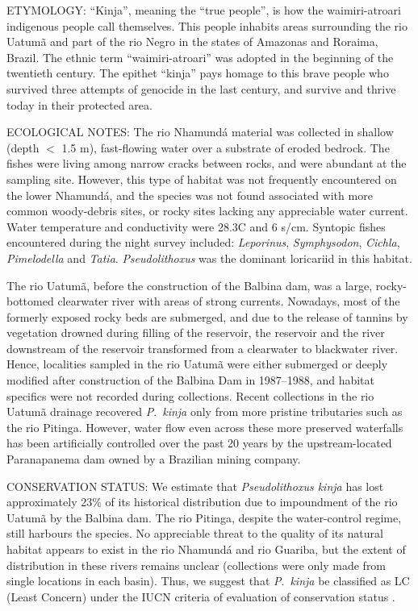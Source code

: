 \documentclass[12pt]{article}
\begin{document}
\noindent ETYMOLOGY: ``Kinja'', meaning the ``true people'', is how the waimiri-atroari indigenous people call themselves. %
This people inhabits areas surrounding the rio Uatumã and part of the rio Negro in the states of Amazonas and Roraima, Brazil. %
The ethnic term ``waimiri-atroari'' was adopted in the beginning of the twentieth century. %
The epithet ``kinja'' pays homage to this brave people who survived three attempts of genocide in the last century, and survive and thrive today in their protected area.\\%
\bigskip

\noindent ECOLOGICAL NOTES: The rio Nhamundá material was collected in shallow (depth $<$ 1.5 m), fast-flowing water over a substrate of eroded bedrock. %
The fishes were living among narrow cracks between rocks, and were abundant at the sampling site. %
However, this type of habitat was not frequently encountered on the lower Nhamundá, and the species was not found associated with more common woody-debris sites, or rocky sites lacking any appreciable water current. %
Water temperature and conductivity were 28.3\degree C and 6 \micro s/cm. %
Syntopic fishes encountered during the night survey included: \emph{Leporinus}, \emph{Symphysodon}, \emph{Cichla}, \emph{Pimelodella} and \emph{Tatia}. %
\emph{Pseudolithoxus} was the dominant loricariid in this habitat.%

The rio Uatumã, before the construction of the Balbina dam, was a large, rocky-bottomed clearwater river with areas of strong currents. %
Nowadays, most of the formerly exposed rocky beds are submerged, and due to the release of tannins by vegetation drowned during filling of the reservoir, the reservoir and the river downstream of the reservoir transformed from a clearwater to blackwater river. %
Hence, localities sampled in the rio Uatumã were either submerged or deeply modified after construction of the Balbina Dam in 1987--1988, and habitat specifics were not recorded during collections. %
Recent collections in the rio Uatumã drainage recovered \emph{P}.\ \emph{kinja} only from more pristine tributaries such as the rio Pitinga. %
However, water flow even across these more preserved waterfalls has been artificially controlled over the past 20 years by the upstream-located Paranapanema dam owned by a Brazilian mining company.\\%
\bigskip

\noindent CONSERVATION STATUS: We estimate that \emph{Pseudolithoxus kinja} has lost approximately 23\% of its historical distribution due to impoundment of the rio Uatumã by the Balbina dam. %
The rio Pitinga, despite the water-control regime, still harbours the species. %
No appreciable threat to the quality of its natural habitat appears to exist in the rio Nhamundá and rio Guariba, but the extent of distribution in these rivers remains unclear (collections were only made from single locations in each basin). %
Thus, we suggest that \emph{P}.\ \emph{kinja} be classified as LC (Least Concern) under the IUCN criteria of evaluation of conservation status \citep{IUCN2012}.%
\end{document}
